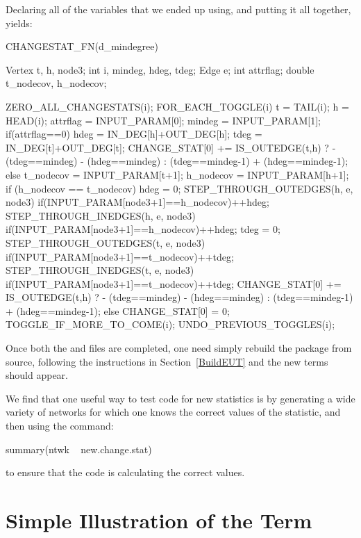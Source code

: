 \documentclass[nojss]{jss}
\begin{document}
Declaring all of the variables that we ended up using, and putting it all
together, yields:
\begin{CodeChunk}
\begin{CodeInput}
CHANGESTAT_FN(d_mindegree) {
  Vertex t, h, node3;
  int i, mindeg, hdeg, tdeg;
  Edge e;
  int attrflag;
  double t_nodecov, h_nodecov;

  ZERO_ALL_CHANGESTATS(i);
  FOR_EACH_TOGGLE(i) {
    t = TAIL(i); h = HEAD(i);
    attrflag = INPUT_PARAM[0];
    mindeg = INPUT_PARAM[1];
    if(attrflag==0){
      hdeg = IN_DEG[h]+OUT_DEG[h];
      tdeg = IN_DEG[t]+OUT_DEG[t];
      CHANGE_STAT[0] += IS_OUTEDGE(t,h) ?
        - (tdeg==mindeg) - (hdeg==mindeg) :
        (tdeg==mindeg-1) + (hdeg==mindeg-1);
    }else{
      t_nodecov = INPUT_PARAM[t+1];
      h_nodecov = INPUT_PARAM[h+1];
      if (h_nodecov == t_nodecov) {
        hdeg = 0;
        STEP_THROUGH_OUTEDGES(h, e, node3) { 
          if(INPUT_PARAM[node3+1]==h_nodecov){++hdeg;}
        }
        STEP_THROUGH_INEDGES(h, e, node3) { 
          if(INPUT_PARAM[node3+1]==h_nodecov){++hdeg;}
        }
        tdeg = 0;
        STEP_THROUGH_OUTEDGES(t, e, node3) { 
          if(INPUT_PARAM[node3+1]==t_nodecov){++tdeg;}
        }
        STEP_THROUGH_INEDGES(t, e, node3) { 
          if(INPUT_PARAM[node3+1]==t_nodecov){++tdeg;}
        }
        CHANGE_STAT[0] += IS_OUTEDGE(t,h) ?
          - (tdeg==mindeg) - (hdeg==mindeg) :
          (tdeg==mindeg-1) + (hdeg==mindeg-1);
      }else{
        CHANGE_STAT[0] = 0;
      }
    }
    TOGGLE_IF_MORE_TO_COME(i);
  }
  UNDO_PREVIOUS_TOGGLES(i);
}
\end{CodeInput}
\end{CodeChunk}
Once both the  and  files are completed, one need simply rebuild the package from source, following the instructions in Section~\ref{BuildEUT} and the new terms should appear.

We find that one useful way to test code for new statistics is by generating a wide variety of networks for which one knows the correct values of the statistic, and then using the command:
\begin{CodeChunk}
\begin{CodeInput}
summary(ntwk ~ new.change.stat)
\end{CodeInput}
\end{CodeChunk}
to ensure that the code is calculating the correct values.

\section[Simple Illustration of the mindegree Term]
{Simple Illustration of the  Term}
\end{document}
